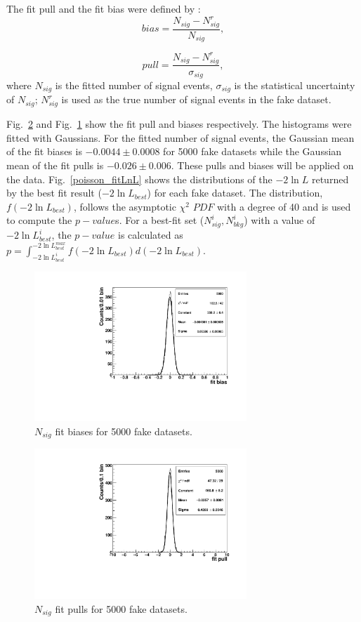 The fit pull and the fit bias were defined by \cite{leta}:
\begin{equation}
bias=\frac{N_{sig}-N^r_{sig}}{N_{sig}},
\end{equation}

\begin{equation}
pull=\frac{N_{sig}-N^r_{sig}}{\sigma_{sig}},
\end{equation}
where $N_{sig}$ is the fitted number of signal events, $\sigma_{sig}$ is the statistical uncertainty of $N_{sig}$; $N^{r}_{sig}$ is used as the true number of signal events in the fake dataset.

Fig.~\ref{poisson_fitPull} and Fig.~\ref{poisson_fitBias} show the fit pull and biases respectively. The histograms were fitted with Gaussians. For the fitted number of signal events, the Gaussian mean of the fit biases is $-0.0044\pm0.0008$ for 5000 fake datasets while the Gaussian mean of the fit pulls is $-0.026\pm0.006$. These pulls and biases will be applied on the data. Fig.~\ref{poisson_fitLnL} shows the distributions of the $-2\ln L$ returned by the best fit result ($-2\ln L_{best}$) for each fake dataset. The distribution, $f({-2\ln L_{best}})$, follows the asymptotic $\chi^2$ $PDF$ with a degree of 40 and is used to compute the $p-value$s\cite{pdg2020}. For a best-fit set ($N^i_{sig},N^i_{bkg}$) with a value of $-2\ln L^i_{best}$, the $p-value$ is calculated as $p=\int_{-2\ln L^{i}_{best}}^{-2\ln L^{max}_{best}}f({-2\ln L_{best}})d(-2\ln L_{best})$.

\begin{figure}[!htb]
	\centering
	\includegraphics[width=8cm]{ensemble_fitBias.pdf}
	\caption{$N_{sig}$ fit biases for 5000 fake datasets.}
	\label{poisson_fitBias}
\end{figure} 

\begin{figure}[!htb]
	\centering
	\includegraphics[width=8cm]{ensemble_fitPull.pdf}
	\caption{$N_{sig}$ fit pulls for 5000 fake datasets.}
	\label{poisson_fitPull}
\end{figure} 

